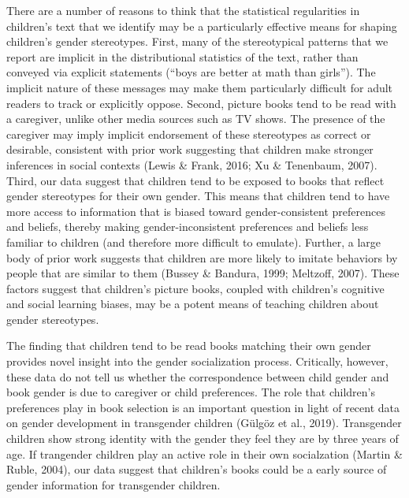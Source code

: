 \documentclass[english,,man,floatsintext]{apa6}
\begin{document}
There are a number of reasons to think that the statistical regularities in children's text that we identify may be a particularly effective means for shaping children's gender stereotypes. First, many of the stereotypical patterns that we report are implicit in the distributional statistics of the text, rather than conveyed via explicit statements (\enquote{boys are better at math than girls}). The implicit nature of these messages may make them particularly difficult for adult readers to track or explicitly oppose. Second, picture books tend to be read with a caregiver, unlike other media sources such as TV shows. The presence of the caregiver may imply implicit endorsement of these stereotypes as correct or desirable, consistent with prior work suggesting that children make stronger inferences in social contexts (Lewis \& Frank, 2016; Xu \& Tenenbaum, 2007). Third, our data suggest that children tend to be exposed to books that reflect gender stereotypes for their own gender. This means that children tend to have more access to information that is biased toward gender-consistent preferences and beliefs, thereby making gender-inconsistent preferences and beliefs less familiar to children (and therefore more difficult to emulate). Further, a large body of prior work suggests that children are more likely to imitate behaviors by people that are similar to them (Bussey \& Bandura, 1999; Meltzoff, 2007). These factors suggest that children's picture books, coupled with children's cognitive and social learning biases, may be a potent means of teaching children about gender stereotypes.

The finding that children tend to be read books matching their own gender provides novel insight into the gender socialization process. Critically, however, these data do not tell us whether the correspondence between child gender and book gender is due to caregiver or child preferences. The role that children's preferences play in book selection is an important question in light of recent data on gender development in transgender children (Gülgöz et al., 2019). Transgender children show strong identity with the gender they feel they are by three years of age. If trangender children play an active role in their own socialzation (Martin \& Ruble, 2004), our data suggest that children's books could be a early source of gender information for transgender children.
\end{document}
